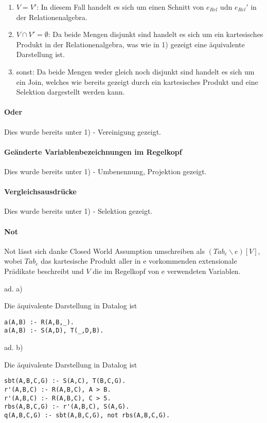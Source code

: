 \documentclass[12pt,a4paper]{amsart}
\begin{document}
\begin{aufgabe1}
\begin{enumerate}
\item $V = V'$: In diesem Fall handelt es sich um einen Schnitt von $e_{Rel}$ udn $e_{Rel}'$ in der Relationenalgebra.
\item $V \cap V' = \emptyset$: Da beide Mengen disjunkt sind handelt es sich um ein kartesisches Produkt in der Relationenalgebra, was wie in 1) gezeigt eine äquivalente Darstellung ist.
\item sonst: Da beide Mengen weder gleich noch disjunkt sind handelt es sich um ein Join, welches wie bereits gezeigt durch ein kartesisches Produkt und eine Selektion dargestellt werden kann.
\end{enumerate}

\paragraph{\textbf{Oder}}
Dies wurde bereits unter 1) - Vereinigung gezeigt.

\paragraph{\textbf{Geänderte Variablenbezeichnungen im Regelkopf}}
Dies wurde bereits unter 1) - Umbenennung, Projektion gezeigt.

\paragraph{\textbf{Vergleichsausdrücke}}
Dies wurde bereits unter 1) - Selektion gezeigt. 

\paragraph{\textbf{Not}}
Not lässt sich danke Closed World Assumption umschreiben als $(Tab_e \backslash e)[V]$, wobei $Tab_e$ das kartesische Produkt aller in e vorkommenden extensionale Prädikate beschreibt und $V$ die im Regelkopf von e verwendeten Variablen.

\end{aufgabe1}


\begin{aufgabe1}
ad. a)

Die äquivalente Darstellung in Datalog ist

\begin{lstlisting}
a(A,B) :- R(A,B,_).
a(A,B) :- S(A,D), T(_,D,B).
\end{lstlisting}

ad. b)

Die äquivalente Darstellung in Datalog ist


\begin{lstlisting}
sbt(A,B,C,G) :- S(A,C), T(B,C,G).
r'(A,B,C) :- R(A,B,C), A > B.
r'(A,B,C) :- R(A,B,C), C > 5.
rbs(A,B,C,G) :- r'(A,B,C), S(A,G).
q(A,B,C,G) :- sbt(A,B,C,G), not rbs(A,B,C,G).
\end{lstlisting}
\end{aufgabe1}

\begin{aufgabe1}
\end{aufgabe1}
\end{document}

